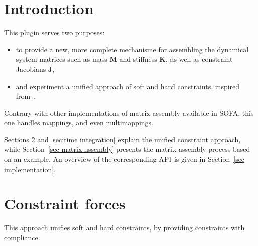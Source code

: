 \newcommand{\vect}[1]{\mathbf{#1}}
\newcommand{\mat}[1]{\mathbf{#1}}

\newcommand{\pos}{\vect{x}}
\newcommand{\dx}{\vect{\Delta x}}
\newcommand{\xcur}{\vect{x}_{n}}
\newcommand{\xnext}{\vect{x}_{n+1}}
\newcommand{\vel}{\vect{v}}
\newcommand{\dv}{\vect{\Delta v}}
\newcommand{\vcur}{\vect{v}_{n}}
\newcommand{\vnext}{\vect v_{n+1}}
\newcommand{\acc}{\vect{a}}
\newcommand{\force}{\vect{f}}
\newcommand{\forcext}{\vect{f}_{ext}} 
\newcommand{\lam}{\vect{\lambda}}
\newcommand{\lcur}{\lam_{n}}
\newcommand{\lnext}{\lam_{n+1}}
\newcommand{\avlam}{\bar{\lam}}
\newcommand{\fcur}{\vect{f}_{n}}
\newcommand{\fnext}{\vect f_{n+1}}
\newcommand{\M}{\mat M}
\newcommand{\Minv}{\mat M^{-1}}
\renewcommand{\P}{\mat P}
\newcommand{\I}{\mat I}
\newcommand{\J}{\mat J}
\newcommand{\Jt}{\mat J^T}
\newcommand{\C}{\mat C}
\newcommand{\D}{\mat D}
\newcommand{\K}{\mat K}
\newcommand{\violation}{ \phi}
\newcommand{\dviolation}{\dot \violation}
\newcommand{\violcur}{\violation_{n}}
\newcommand{\dviolcur}{\dot \violcur}
\newcommand{\violnext}{\violation_{n+1}}
\newcommand{\dviolnext}{\dot \violation_{n+1}}
\newcommand{\cmp}{c}
\newcommand{\dampingratio}{d}

\section{Introduction}
This plugin serves two purposes:
\begin{itemize}
 \item to provide a new, more complete mechanisme for assembling the dynamical system matrices such as mass $\M$ and stiffness $\K$, as well as constraint Jacobians $\J$,
 \item and experiment a unified approach of soft and hard constraints, inspired from~\cite{servin2006interactive}.
\end{itemize}
Contrary with other implementations of matrix assembly available in SOFA, this one handles mappings, and even multimappings.

Sections \ref{sec constraint forces} and \ref{sec:time integration} explain the unified constraint approach, while Section~\ref{sec matrix assembly} presents the matrix assembly process based on an example. An overview of the corresponding API is given in Section~\ref{sec implementation}. 

\section{Constraint forces} \label{sec constraint forces}
This approach unifies soft and hard constraints, by providing constraints with compliance. 
